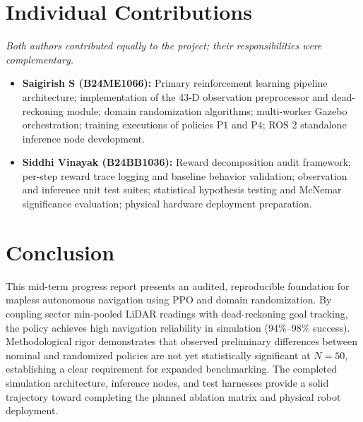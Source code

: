 \documentclass[conference]{IEEEtran}
\begin{document}
\section{Individual Contributions}
\textit{Both authors contributed equally to the project; their responsibilities were complementary.}

\begin{itemize}
    \item \textbf{Saigirish S (B24ME1066):} Primary reinforcement learning pipeline architecture; implementation of the 43-D observation preprocessor and dead-reckoning module; domain randomization algorithms; multi-worker Gazebo orchestration; training executions of policies $\text{P1}$ and $\text{P4}$; ROS 2 standalone inference node development.
    \item \textbf{Siddhi Vinayak (B24BB1036):} Reward decomposition audit framework; per-step reward trace logging and baseline behavior validation; observation and inference unit test suites; statistical hypothesis testing and McNemar significance evaluation; physical hardware deployment preparation.
\end{itemize}

\section{Conclusion}
This mid-term progress report presents an audited, reproducible foundation for mapless autonomous navigation using PPO and domain randomization. By coupling sector min-pooled LiDAR readings with dead-reckoning goal tracking, the policy achieves high navigation reliability in simulation (94\%--98\% success). Methodological rigor demonstrates that observed preliminary differences between nominal and randomized policies are not yet statistically significant at $N=50$, establishing a clear requirement for expanded benchmarking. The completed simulation architecture, inference nodes, and test harnesses provide a solid trajectory toward completing the planned ablation matrix and physical robot deployment.



\end{document}
